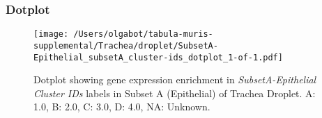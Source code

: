 \clearpage

\subsubsection{Dotplot}
\begin{figure}[h]
\centering
\texttt{[image: /Users/olgabot/tabula-muris-supplemental/Trachea/droplet/SubsetA-Epithelial\_subsetA\_cluster-ids\_dotplot\_1-of-1.pdf]}

\caption{ Dotplot  showing gene expression enrichment in \emph{SubsetA-Epithelial Cluster IDs} labels in Subset A (Epithelial) of Trachea Droplet. A: 1.0, B: 2.0, C: 3.0, D: 4.0, NA: Unknown.}
\end{figure}

